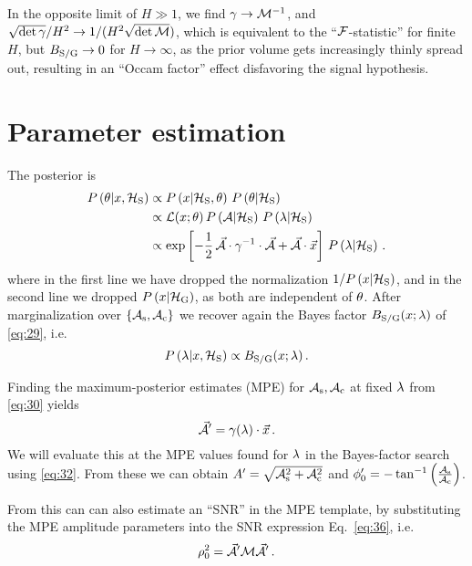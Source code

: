 \documentclass[aps,prd,onecolumn,notitlepage,nofootinbib,superscriptaddress,altaffilletter,floatfix]{revtex4-1}
\begin{document}
In the opposite limit of $H\gg 1$, we find $\gamma\rightarrow\mathcal{M}^{-1}$, and $\sqrt{\det\gamma}/H^2\rightarrow 1/(H^2\sqrt{\det\mathcal{M}})$, which is equivalent to
the ``$\mathcal{F}$-statistic'' for finite $H$, but $B_{\mathrm{S/G}}\rightarrow 0$ for $H\rightarrow \infty$, as the prior volume gets increasingly thinly spread out,
resulting in an ``Occam factor'' effect disfavoring the signal hypothesis.

\section{Parameter estimation}
\label{sec:parameter-estimation}

The posterior is
\begin{align}
  P\left(\theta|x,\mathcal{H}_{\mathrm{S}}\right) &\propto P\left(x|\mathcal{H}_{\mathrm{S}},\theta\right)\,P\left(\theta|\mathcal{H}_{\mathrm{S}}\right) \notag\\
    &\propto \mathcal{L}(x;\theta)\,P\left(\mathcal{A}|\mathcal{H}_{\mathrm{S}}\right)\,P\left(\lambda|\mathcal{H}_{\mathrm{S}}\right) \notag\\
    &\propto \exp\left[-\frac{1}{2}\, \vec{\mathcal{A}}\cdot\gamma^{-1}\cdot\vec{\mathcal{A}} + \vec{\mathcal{A}}\cdot\vec{x}\right]\,P\left(\lambda|\mathcal{H}_{\mathrm{S}}\right)\,.  \label{eq:30}
\end{align}
where in the first line we have dropped the normalization $1/P\left(x|\mathcal{H}_{\mathrm{S}}\right)$, and in the second line we dropped $P\left(x|\mathcal{H}_{\mathrm{G}}\right)$, as both are
independent of $\theta$.
After marginalization over $\{\mathcal{A}_{\mathrm{s}},\mathcal{A}_{\mathrm{c}}\}$ we recover again the Bayes factor $B_{\mathrm{S/G}}(x;\lambda)$ of \eqref{eq:29}, i.e.
\begin{equation}
  \label{eq:32}
  P\left(\lambda|x,\mathcal{H}_{\mathrm{S}}\right) \propto B_{\mathrm{S/G}}(x;\lambda)\,.
\end{equation}

Finding the maximum-posterior estimates (MPE) for $\mathcal{A}_{\mathrm{s}},\mathcal{A}_{\mathrm{c}}$ at fixed $\lambda$ from \eqref{eq:30} yields
\begin{equation}
  \label{eq:31}
  \vec{\mathcal{A}}' = \gamma(\lambda)\cdot\vec{x}\,.
\end{equation}
We will evaluate this at the MPE values found for $\lambda$ in the Bayes-factor search using \eqref{eq:32}.
From these we can obtain $A' = \sqrt{\mathcal{A}_{\mathrm{s}}^2+\mathcal{A}_{\mathrm{c}}^2}$ and $\phi_0' = - \tan^{-1}\left(\frac{\mathcal{A}_{\mathrm{s}}}{\mathcal{A}_{\mathrm{c}}}\right)$.

From this can can also estimate an ``SNR'' in the MPE template, by substituting the MPE amplitude parameters into the SNR expression
Eq.~\eqref{eq:36}, i.e.\
\begin{equation}
  \label{eq:20}
  \rho_0^2 = \vec{\mathcal{A}}'\mathcal{M}\vec{\mathcal{A}}'\,.
\end{equation}
\end{document}
